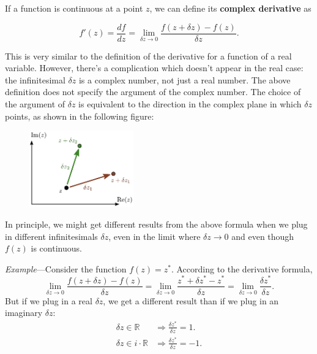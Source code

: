 \documentclass[10pt,a4paper]{article}
\begin{document}
If a function is continuous at a point $z$, we can define its
\textbf{complex derivative} as

\begin{framed} \noindent
  \begin{equation}
    f'(z) = \frac{df}{dz}
    = \lim_{\delta z\rightarrow 0} \frac{f(z+\delta z) - f(z)}{\delta z}.
  \end{equation}
\end{framed}

\noindent
This is very similar to the definition of the derivative for a
function of a real variable. However, there's a complication which
doesn't appear in the real case: the infinitesimal $\delta z$ is a
complex number, not just a real number. The above definition does not
specify the argument of the complex number.  The choice of the
argument of $\delta z$ is equivalent to the direction in the complex
plane in which $\delta z$ points, as shown in the following figure:

\begin{figure}[h]
  \centering\includegraphics[width=0.4\textwidth]{complex_derivative}
\end{figure}

In principle, we might get different results from the above formula when
we plug in different infinitesimals $\delta z$, even in the limit
where $\delta z \rightarrow 0$ and even though $f(z)$ is continuous.

\begin{framed} \noindent
\textit{Example}---Consider the function $f(z) = z^*$. According to
the derivative formula,
\begin{equation*}
  \lim_{\delta z \rightarrow0} \frac{f(z+\delta z) - f(z)}{\delta z} = \lim_{\delta z \rightarrow0} \frac{z^*+\delta z^* - z^*}{\delta z} = \lim_{\delta z \rightarrow0} \frac{\delta z^*}{\delta z}.
\end{equation*}
But if we plug in a real $\delta z$, we get a different result than if
we plug in an imaginary $\delta z$:
\begin{align*}
  \delta z \in \mathbb{R} \;\; &\Rightarrow \frac{\delta z^*}{\delta z} = 1.\\
  \delta z \in i \cdot \mathbb{R} &\Rightarrow \frac{\delta z^*}{\delta z}
  = -1.
\end{align*}
\end{framed}
\end{document}
